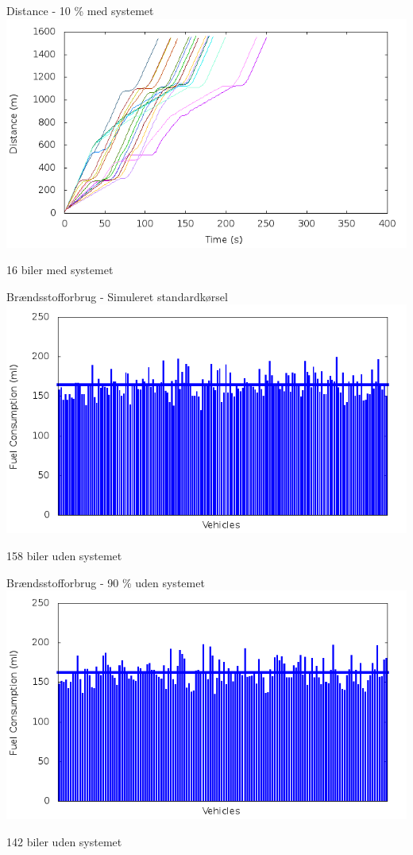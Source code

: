\begin{frame}{Distance - 10 \% med systemet}
\includegraphics[width=1\textwidth]{../images/tp0c1_0/distanceControlled10.png}

16 biler med systemet
\end{frame}

\begin{frame}{Brændsstofforbrug - Simuleret standardkørsel}
\includegraphics[width=1\textwidth]{../images/tp0c1_0/fuelRouteUncontrolled0.png}

158 biler uden systemet
\end{frame}


\begin{frame}{Brændsstofforbrug - 90 \% uden systemet}
\includegraphics[width=1\textwidth]{../images/tp0c1_0/fuelRouteUncontrolled10.png}

142 biler uden systemet
\end{frame}

